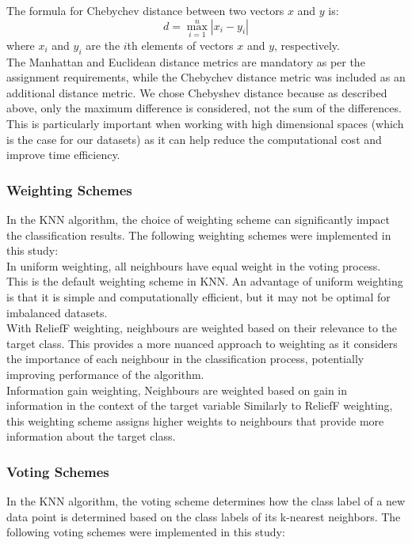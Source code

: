 The formula for Chebychev distance between two vectors \(x\) and \(y\) is:
\[ d = \max_{i=1}^{n} |x_i - y_i| \]
where \(x_i\) and \(y_i\) are the \(i\)th elements of vectors \(x\) and \(y\), respectively.\\

The Manhattan and Euclidean distance metrics are mandatory as per the assignment requirements,
while the Chebychev distance metric was included as an additional distance metric.
We chose Chebyshev distance because as described above, only the maximum difference is considered,
not the sum of the differences. This is particularly important when working with high dimensional spaces (which is the case for our datasets)
as it can help reduce the computational cost and improve time efficiency.


\subsubsection*{Weighting Schemes}
In the KNN algorithm, the choice of weighting scheme can significantly impact the classification results.
The following weighting schemes were implemented in this study:\\

In uniform weighting, all neighbours have equal weight in the voting process.
This is the default weighting scheme in KNN.
An advantage of uniform weighting is that it is simple and computationally efficient, but it may not be optimal for imbalanced datasets.\\

With ReliefF weighting, neighbours are weighted based on their relevance to the target class.
This provides a more nuanced approach to weighting as it considers the importance of each neighbour in the classification process, potentially
improving performance of the algorithm.\\

Information gain weighting, Neighbours are weighted based on gain in information in the context of the target variable\cite{brownlee2019}
Similarly to ReliefF weighting, this weighting scheme assigns higher weights to neighbours that provide more information about the target class.\\

\subsubsection*{Voting Schemes}
In the KNN algorithm, the voting scheme determines how the class label of a new data point is determined based on the class labels of its k-nearest neighbors.
The following voting schemes were implemented in this study:\\

